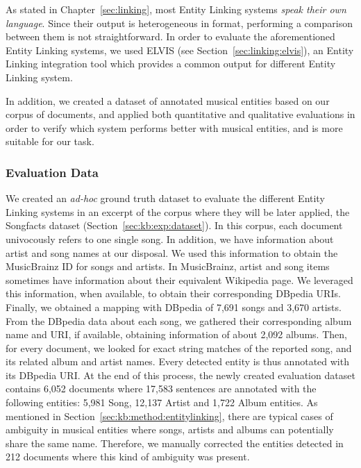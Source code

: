 As stated in Chapter~\ref{sec:linking}, most Entity Linking systems \textit{speak their own language}. Since their output is heterogeneous in format, performing a comparison between them is not straightforward. In order to evaluate the aforementioned Entity Linking systems, we used \textsc{ELVIS} (see Section~\ref{sec:linking:elvis}), an Entity Linking integration tool which provides a common output for different Entity Linking system.

In addition, we created a dataset of annotated musical entities based on our corpus of documents, and applied both quantitative and qualitative evaluations in order to verify which system performs better with musical entities, and is more suitable for our task.



\subsubsection{Evaluation Data}

We created an \textit{ad-hoc} ground truth dataset to evaluate the different Entity Linking systems in an excerpt of the corpus where they will be later applied, the Songfacts dataset (Section~\ref{sec:kb:exp:dataset}). In this corpus, each document univocously refers to one single song. In addition, we have information about artist and song names at our disposal. We used this information to obtain the MusicBrainz ID for songs and artists. In MusicBrainz, artist and song items sometimes have information about their equivalent Wikipedia page. We leveraged this information, when available, to obtain their corresponding DBpedia URIs. Finally, we obtained a mapping with DBpedia of 7,691 songs and 3,670 artists. From the DBpedia data about each song, we gathered their corresponding album name and URI, if available, obtaining information of about 2,092 albums. Then, for every document, we looked for exact string matches of the reported song, and its related album and artist names. Every detected entity is thus annotated with its DBpedia URI. At the end of this process, the newly created evaluation dataset contains 6,052 documents where 17,583 sentences are annotated with the following entities: 5,981 Song, 12,137 Artist and 1,722 Album entities. As mentioned in Section~\ref{sec:kb:method:entitylinking}, there are typical cases of ambiguity in musical entities where songs, artists and albums can potentially share the same name. Therefore, we manually corrected the entities detected in 212 documents where this kind of ambiguity was present.


